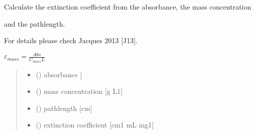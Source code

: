 \documentclass[letterpaper,10pt,english]{sphinxmanual}
\begin{document}
\begin{fulllineitems}
\label{\detokenize{03_absorption_coefficient:skinoptics.absorption_coefficient.ext_from_Abs_and_Cmass}}
\pysigstartsignatures
{}
\pysigstopsignatures
\begin{DUlineblock}{0em}
\item[] Calculate the extinction coefficient from the absorbance, the mass concentration
\item[] and the pathlength.
\item[] For details please check Jacques 2013 {[}J13{]}.
\end{DUlineblock}

\sphinxAtStartPar
\(\varepsilon_{mass} = \frac{Abs}{C_{mass} L}\)
\begin{quote}\begin{description}
\begin{itemize}
\item {} 
\sphinxAtStartPar
{} () \textendash{} absorbance {[}\sphinxhyphen{}{]}

\item {} 
\sphinxAtStartPar
{} () \textendash{} mass concentration {[}g L\sphinxhyphen{}1{]}

\item {} 
\sphinxAtStartPar
{} () \textendash{} pathlength {[}cm{]}

\end{itemize}

\sphinxAtStartPar
\begin{itemize}
\item {} 
\sphinxAtStartPar
{} () \textendash{} extinction coefficient {[}cm\sphinxhyphen{}1 mL mg\sphinxhyphen{}1{]}

\end{itemize}


\end{description}\end{quote}

\end{fulllineitems}
\end{document}
